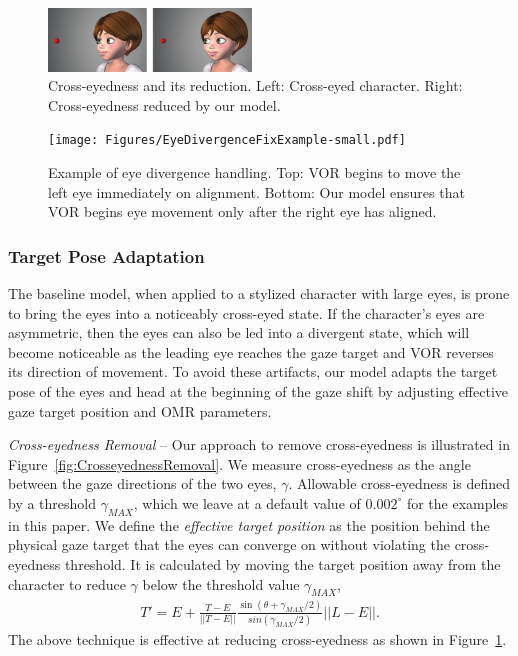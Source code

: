 \begin{figure}[t]
\centering
\vspace{2pt}
\includegraphics[width=0.48\textwidth]{Figures/CrosseyednessFixExample-small.pdf}
\caption{Cross-eyedness and its reduction. Left: Cross-eyed character. Right: Cross-eyedness reduced by our model.}
\vspace{-12pt}
\label{fig:CrosseyednessFixExample}
\end{figure}

\begin{figure}[!b]
\centering
\vspace{-6pt}
\texttt{[image: Figures/EyeDivergenceFixExample-small.pdf]}
\caption{Example of eye divergence handling. Top: VOR begins to move the left eye immediately on alignment. Bottom: Our model ensures that VOR begins eye movement only after the right eye has aligned.}
\vspace{-6pt}
\label{fig:EyeDivergenceFixExample}
\end{figure}

\subsubsection{Target Pose Adaptation}
\label{sec:TargetPoseAdaptation}

The baseline model, when applied to a stylized character with large eyes, is prone to bring the eyes into a noticeably cross-eyed state. If the character's eyes are asymmetric, then the eyes can also be led into a divergent state, which will become noticeable as the leading eye reaches the gaze target and VOR reverses its direction of movement. To avoid these artifacts, our model adapts the target pose of the eyes and head at the beginning of the gaze shift by adjusting effective gaze target position and OMR parameters.

\textit{Cross-eyedness Removal} -- Our approach to remove cross-eyedness is illustrated in Figure~\ref{fig:CrosseyednessRemoval}. We measure cross-eyedness as the angle between the gaze directions of the two eyes, $\gamma$. Allowable cross-eyedness is defined by a threshold $\gamma_{MAX}$, which we leave at a default value of $0.002^{\circ}$ for the examples in this paper.
We define the \textit{effective target position} as the position behind the physical gaze target that the eyes can converge on without violating the cross-eyedness threshold. It is calculated by moving the target position away from the character to reduce $\gamma$ below the threshold value $\gamma_{MAX}$,
\begin{eqnarray}
T' = E + \frac{T-E}{||T-E||} \frac{ \sin( \theta + \gamma_{MAX}/2 ) }{ sin( \gamma_{MAX}/2 ) } ||L-E||.
\end{eqnarray}
The above technique is effective at reducing cross-eyedness as shown in Figure~\ref{fig:CrosseyednessFixExample}.


